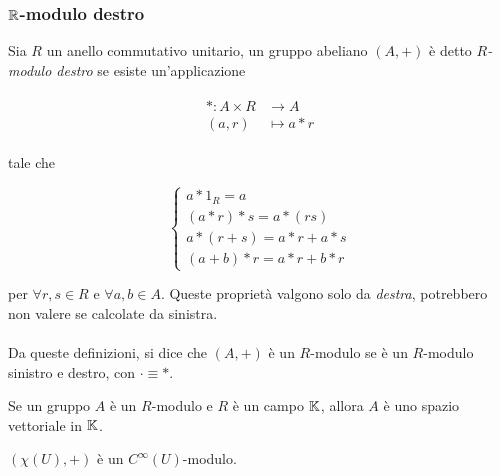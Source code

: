 \subsubsection{$ \mathbb{R} $-modulo destro}

Sia $ R $ un anello commutativo unitario, un gruppo abeliano $ (A,+) $ è detto $ R $\textit{-modulo destro} se esiste un'applicazione

\begin{align}
	\begin{split}
		* : A \times R &\to A\\
		(a,r) &\mapsto a * r
	\end{split}
\end{align}

tale che

\begin{equation}
	\begin{cases}
		a * 1_{R} = a\\
		(a*r)*s = a*(r s)\\
		a*(r+s) = a*r + a*s\\
		(a+b)*r = a*r + b*r
	\end{cases}
\end{equation}

per $ \forall r,s \in R $ e $ \forall a,b \in A $. Queste proprietà valgono solo da \textit{destra}, potrebbero non valere se calcolate da sinistra.\\\\
Da queste definizioni, si dice che $ (A,+) $ è un $ R $-modulo se è un $ R $-modulo sinistro e destro, con $ \cdot \equiv * $.

\begin{remark}
	Se un gruppo $ A $ è un $ R $-modulo e $ R $ è un campo $ \mathbb{K} $, allora $ A $ è uno spazio vettoriale in $ \mathbb{K} $.
\end{remark}

\begin{theorem}\label{chi-mod}
	$ (\chi(U),+) $ è un $ C^{\infty}(U) $-modulo.
\end{theorem}

